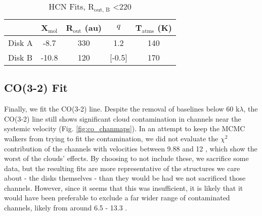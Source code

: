 \begin{table}
  \centering
  \begin{threeparttable}
    \caption{HCN Fits, R$_\text{out, B}$ \textless 220}
    \label{table:hcn_short_rout}
    \renewcommand{\arraystretch}{1.2}
    \begin{tabular}{l c c c c }
      \toprule \toprule
                & X$_\text{mol}$ & R$_\text{out}$ (au)  & $q$    & T$_\text{atms}$ (K) \\
      \midrule %
        Disk A  & -8.7           & 330                  & 1.2    & 140 \\
        Disk B  & -10.8          & 120                  & [-0.5] & 170 \\
      \bottomrule
    \end{tabular}
  \end{threeparttable}
\end{table}




\subsection{CO(3-2) Fit}
\label{subsection:co_fit}
Finally, we fit the CO(3-2) line. Despite the removal of baselines below 60 k$\lambda$, the CO(3-2) line still shows significant cloud contamination in channels near the systemic velocity (Fig. \ref{fig:co_chanmaps}). In an attempt to keep the MCMC walkers from trying to fit the contamination, we did not evaluate the $\chi^2$ contribution of the channels with velocities between 9.88 and 12 \kms, which show the worst of the clouds' effects. By choosing to not include these, we sacrifice some data, but the resulting fits are more representative of the structures we care about - the disks themselves - than they would be had we not sacrificed those channels. However, since it seems that this was insufficient, it is likely that it would have been preferable to exclude a far wider range of contaminated channels, likely from around 6.5 - 13.3 \kms.



